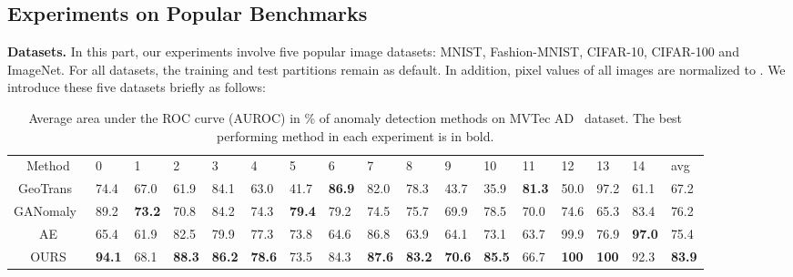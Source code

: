 \documentclass[journal]{IEEEtran}
\begin{document}
\subsection{Experiments on Popular Benchmarks}
\noindent\textbf{Datasets.}
In this part, our experiments involve five popular image datasets: MNIST, Fashion-MNIST, CIFAR-10, CIFAR-100 and ImageNet. For all datasets, the training and test partitions remain as default. In addition, pixel values of all images are normalized to . We introduce these five datasets briefly as follows:
\renewcommand \arraystretch{0.95}
\begin{table*}[t]
	\centering
		\caption{Average area under the ROC curve (AUROC) in \% of anomaly detection methods on MVTec AD~\cite{bergmann2019mvtec} dataset. The best performing method in each experiment is in bold.}
	\footnotesize
	\begin{tabular}{cx{0.54cm}x{0.54cm}x{0.54cm}x{0.54cm}x{0.54cm}x{0.54cm}x{0.54cm}x{0.54cm}x{0.54cm}x{0.54cm}x{0.54cm}x{0.54cm}x{0.54cm}x{0.54cm}x{0.54cm}x{0.54cm}}
		\toprule
		 Method & 0 & 1 & 2 & 3 & 4 & 5 & 6 & 7 & 8 & 9 & 10 & 11 & 12 & 13 & 14 & avg\\
		\cmidrule(lr){1-1} \cmidrule(lr){2-2} \cmidrule(lr){3-3} \cmidrule(lr){4-4} \cmidrule(lr){5-5} \cmidrule(lr){6-6} \cmidrule(lr){7-7} \cmidrule(lr){8-8} \cmidrule(lr){9-9} \cmidrule(lr){10-10} \cmidrule(lr){11-11} \cmidrule(lr){12-12} \cmidrule(lr){13-13} \cmidrule(lr){14-14} \cmidrule(lr){15-15} \cmidrule(lr){16-16} \cmidrule(lr){17-17} 
		GeoTrans~\cite{golan2018deep} & 74.4 & 67.0 & 61.9 & 84.1 & 63.0 & 41.7 & \textbf{86.9} & 82.0 & 78.3 & 43.7 & 35.9 & \textbf{81.3} & 50.0 & 97.2 & 61.1 & 67.2\\
		GANomaly~\cite{Akcay2018} & 89.2 & \textbf{73.2} & 70.8 & 84.2 & 74.3 & \textbf{79.4} & 79.2 & 74.5 & 75.7 & 69.9 & 78.5 & 70.0 & 74.6 & 65.3 & 83.4 & 76.2\\
		AE & 65.4 & 61.9 & 82.5 & 79.9 & 77.3 & 73.8 & 64.6 & 86.8 & 63.9 & 64.1 & 73.1 & 63.7 & 99.9 & 76.9 & \textbf{97.0} & 75.4\\
		OURS & \textbf{94.1} & 68.1 & \textbf{88.3} & \textbf{86.2} & \textbf{78.6} & 73.5 & 84.3 & \textbf{87.6} & \textbf{83.2} & \textbf{70.6} & \textbf{85.5} & 66.7 & \textbf{100} & \textbf{100} & 92.3 & \textbf{83.9}\\
		\bottomrule
		\end{tabular}
	\label{tal:MVTec}
\end{table*}
\end{document}
